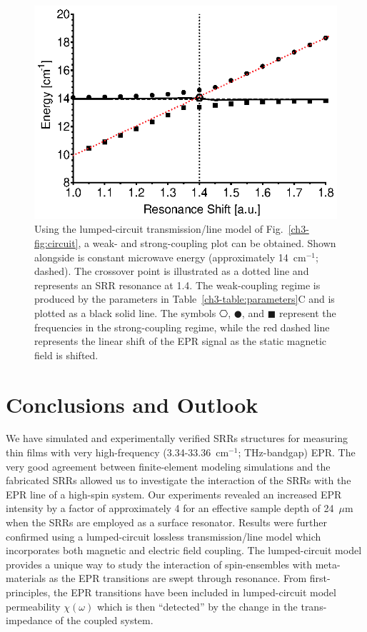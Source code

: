 \begin{figure}[htp]\centering
  \includegraphics{Kapitel/Ch3-Images/08-RadiationDampening.eps}%
  \caption[Calculated weak- and strong-coupling regime using the analytical model.]{Using the lumped-circuit transmission\-/line model of Fig.~\ref{ch3-fig:circuit}, a weak- and strong-coupling plot can be obtained. Shown alongside is constant microwave energy (approximately 14~cm$^{-1}$; dashed). The crossover point is illustrated as a dotted line and represents an SRR resonance at 1.4. The weak-coupling regime is produced by the parameters in Table~\ref{ch3-table:parameters}C and is plotted as a black solid line. The symbols $\hexagon$, $\CIRCLE$, and $\blacksquare$ represent the frequencies in the strong-coupling regime, while the red dashed line represents the linear shift of the EPR signal as the static magnetic field is shifted.}\label{ch3-fig:strong-weak}
\end{figure}

\section{Conclusions and Outlook}
We have simulated and experimentally verified SRRs structures for measuring thin films with very high-frequency (3.34-33.36~cm$^{-1}$; THz-bandgap) EPR. The very good agreement between finite-element modeling simulations and the fabricated SRRs allowed us to investigate the interaction of the SRRs with the EPR line of a high-spin system. Our experiments revealed an increased EPR intensity by a factor of approximately 4 for an effective sample depth of 24~$\mu$m when the SRRs are employed as a surface resonator. Results were further confirmed using a lumped-circuit lossless transmission\-/line model which incorporates both magnetic and electric field coupling. The lumped-circuit model provides a unique way to study the interaction of spin-ensembles with meta-materials as the EPR transitions are swept through resonance. From first-principles, the EPR transitions have been included in lumped-circuit model permeability $\chi(\omega)$ which is then ``detected'' by the change in the trans-impedance of the coupled system.

